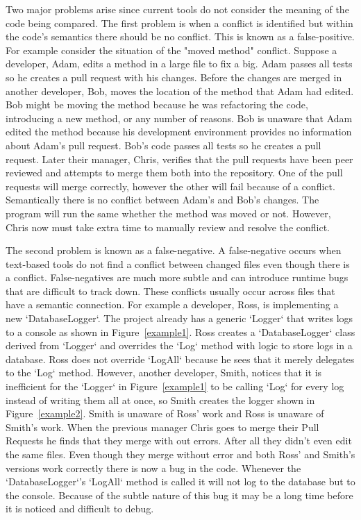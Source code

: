 \documentclass[draftclsnofoot,onecolumn]{IEEEtran}
\begin{document}
Two major problems arise since current tools do not consider the meaning of 
the code being compared. The first problem is when a conflict is identified 
but within the code's semantics there should be no conflict. This is known 
as a false-positive. For example consider the situation of the "moved 
method" conflict. Suppose a developer, Adam, edits a method in a large file 
to fix a big. Adam passes all tests so he creates a pull request with his 
changes. Before the changes are merged in another developer, Bob, moves the 
location of the method that Adam had edited. Bob might be moving the method 
because he was refactoring the code, introducing a new method, or any number 
of reasons. Bob is unaware that Adam edited the method because his 
development environment provides no information about Adam's pull request. 
Bob's code passes all tests so he creates a pull request. Later their 
manager, Chris, verifies that the pull requests have been peer reviewed and 
attempts to merge them both into the repository. One of the pull requests 
will merge correctly, however the other will fail because of a conflict. 
Semantically there is no conflict between Adam's and Bob's changes. The 
program will run the same whether the method was moved or not. However, 
Chris now must take extra time to manually review and resolve the conflict.

The second problem is known as a false-negative. A false-negative occurs 
when text-based tools do not find a conflict between changed files even 
though there is a conflict. False-negatives are much more subtle and can 
introduce runtime bugs that are difficult to track down. These conflicts 
usually occur across files that have a semantic connection. For example a 
developer, Ross, is implementing a new `DatabaseLogger`. The project already 
has a generic `Logger` that writes logs to a console as shown in 
Figure~\ref{example1}. Ross creates a `DatabaseLogger` class derived from 
`Logger` and overrides the `Log` method with logic to store logs in a 
database. Ross does not override `LogAll` because he sees that it merely 
delegates to the `Log` method. However, another developer, Smith, notices 
that it is inefficient for the `Logger` in Figure~\ref{example1} to be 
calling `Log` for every log instead of writing them all at once, so Smith 
creates the logger shown in Figure~\ref{example2}. Smith is unaware of Ross' 
work and Ross is unaware of Smith's work. When the previous manager Chris 
goes to merge their Pull Requests he finds that they merge with out errors. 
After all they didn't even edit the same files. Even though they merge 
without error and both Ross' and Smith's versions work correctly there is 
now a bug in the code. Whenever the `DatabaseLogger`’s `LogAll` method is 
called it will not log to the database but to the console. Because of the 
subtle nature of this bug it may be a long time before it is noticed and 
difficult to debug.
\end{document}
